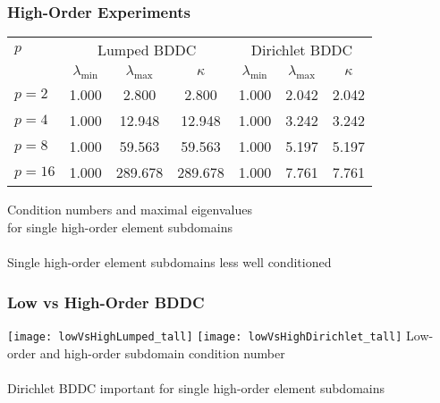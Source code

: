 \documentclass{beamer}
\begin{document}
\begin{frame}
\begin{center}
\frametitle{High-Order Experiments}

\begin{table}[ht!]
\begin{center}
\begin{tabular}{l ccc ccc}
  \toprule
  $p$  &  \multicolumn{3}{c}{Lumped BDDC}  &  \multicolumn{3}{c}{Dirichlet BDDC}  \\
                      &  $\lambda_{\min}$  &  $\lambda_{\max}$  &  $\kappa$ & $\lambda_{\min}$  &  $\lambda_{\max}$ & $\kappa$  \\
  \toprule
  $p = 2$   &  1.000  &    2.800  &    2.800  &  1.000  &  2.042  &  2.042  \\
  $p = 4$   &  1.000  &   12.948  &   12.948  &  1.000  &  3.242  &  3.242  \\
  $p = 8$   &  1.000  &   59.563  &   59.563  &  1.000  &  5.197  &  5.197  \\
  $p = 16$  &  1.000  &  289.678  &  289.678  &  1.000  &  7.761  &  7.761  \\
  \bottomrule
\end{tabular}
\end{center}
\label{table:high_order_element_bddc}
\end{table}
{\small Condition numbers and maximal eigenvalues\\for single high-order element subdomains}\\

~\\

Single high-order element subdomains less well conditioned

\end{center}
\end{frame}


\begin{frame}
\begin{center}
\frametitle{Low vs High-Order BDDC}

\texttt{[image: lowVsHighLumped\_tall]}
\hspace{0.3cm}
\texttt{[image: lowVsHighDirichlet\_tall]}
{\small Low-order and high-order subdomain condition number}\\

~\\

Dirichlet BDDC important for single high-order element subdomains

\end{center}
\end{frame}
\end{document}
